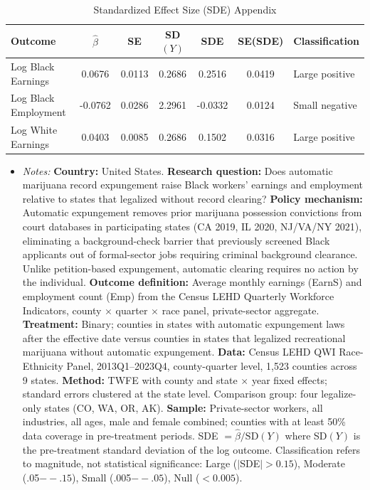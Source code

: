 \begin{table}[h!]
\centering
\caption{Standardized Effect Size (SDE) Appendix}
\label{tab:sde}
\begin{tabular}{lcccccl}
\toprule
Outcome & $\hat{\beta}$ & SE & SD$(Y)$ & SDE & SE(SDE) & Classification \\
\midrule
Log Black Earnings & 0.0676 & 0.0113 & 0.2686 & 0.2516 & 0.0419 & Large positive \\
Log Black Employment & -0.0762 & 0.0286 & 2.2961 & -0.0332 & 0.0124 & Small negative \\
Log White Earnings & 0.0403 & 0.0085 & 0.2686 & 0.1502 & 0.0316 & Large positive \\
\bottomrule
\end{tabular}
\begin{itemize}[leftmargin=*,noitemsep]
\item \textit{Notes:} \textbf{Country:} United States. \textbf{Research question:} Does automatic marijuana record expungement raise Black workers' earnings and employment relative to states that legalized without record clearing? \textbf{Policy mechanism:} Automatic expungement removes prior marijuana possession convictions from court databases in participating states (CA 2019, IL 2020, NJ/VA/NY 2021), eliminating a background-check barrier that previously screened Black applicants out of formal-sector jobs requiring criminal background clearance. Unlike petition-based expungement, automatic clearing requires no action by the individual. \textbf{Outcome definition:} Average monthly earnings (EarnS) and employment count (Emp) from the Census LEHD Quarterly Workforce Indicators, county $\times$ quarter $\times$ race panel, private-sector aggregate. \textbf{Treatment:} Binary; counties in states with automatic expungement laws after the effective date versus counties in states that legalized recreational marijuana without automatic expungement. \textbf{Data:} Census LEHD QWI Race-Ethnicity Panel, 2013Q1--2023Q4, county-quarter level, 1,523 counties across 9 states. \textbf{Method:} TWFE with county and state $\times$ year fixed effects; standard errors clustered at the state level. Comparison group: four legalize-only states (CO, WA, OR, AK). \textbf{Sample:} Private-sector workers, all industries, all ages, male and female combined; counties with at least 50\% data coverage in pre-treatment periods. SDE $= \hat{\beta} / \text{SD}(Y)$ where SD$(Y)$ is the pre-treatment standard deviation of the log outcome. Classification refers to magnitude, not statistical significance: Large ($|$SDE$| > 0.15$), Moderate (.05$--.15$), Small (.005$--.05$), Null ($< 0.005$).
\end{itemize}
\end{table}

